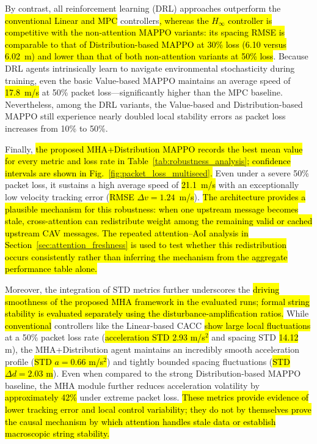 \documentclass{ieeeaccess}
\begin{document}
By contrast, all reinforcement learning (DRL) approaches outperform the \hl{conventional Linear and MPC} controllers\hl{, whereas the $H_\infty$ controller is competitive with the non-attention MAPPO variants: its spacing RMSE is comparable to that of Distribution-based MAPPO at 30\% loss (6.10 versus 6.02~m) and lower than that of both non-attention variants at 50\% loss}. Because DRL agents intrinsically learn to navigate environmental stochasticity during training, even the basic Value-based MAPPO maintains an average speed of \hl{17.8~m/s} at 50\% packet loss—significantly higher than the MPC baseline. Nevertheless, among the DRL variants, the Value-based and Distribution-based MAPPO still experience nearly doubled local stability errors as packet loss increases from 10\% to 50\%.

Finally, \hl{the proposed MHA+Distribution MAPPO records the best mean value for every metric and loss rate in Table~\ref{tab:robustness_analysis}; confidence intervals are shown in Fig.~\ref{fig:packet_loss_multiseed}.} Even under a severe 50\% packet loss, it sustains a high average speed of \hl{21.1~m/s} with an exceptionally low velocity tracking error (\hl{RMSE $\Delta v = 1.24$~m/s}). \hl{The architecture provides a plausible mechanism for this robustness: when one upstream message becomes stale, cross-attention can redistribute weight among the remaining valid or cached upstream CAV messages. The repeated attention--AoI analysis in Section~\ref{sec:attention_freshness} is used to test whether this redistribution occurs consistently rather than inferring the mechanism from the aggregate performance table alone.} %

Moreover, the integration of STD metrics further underscores the \hl{driving smoothness of the proposed MHA framework in the evaluated runs; formal string stability is evaluated separately using the disturbance-amplification ratios.} While \hl{conventional} controllers like the Linear-based CACC \hl{show large local fluctuations} at a 50\% packet loss rate (\hl{acceleration STD 2.93 m/s$^2$} and spacing STD \hl{14.12} m), the MHA+Distribution agent maintains an incredibly smooth acceleration profile (\hl{STD $a = 0.66$ m/s$^2$}) and tightly bounded spacing fluctuations (\hl{STD $\Delta d = 2.03$ m}). Even when compared to the strong Distribution-based MAPPO baseline, the MHA module further reduces acceleration volatility by \hl{approximately 42\%} under extreme packet loss. \hl{These metrics provide evidence of lower tracking error and local control variability; they do not by themselves prove the causal mechanism by which attention handles stale data or establish macroscopic string stability.} %
\end{document}
